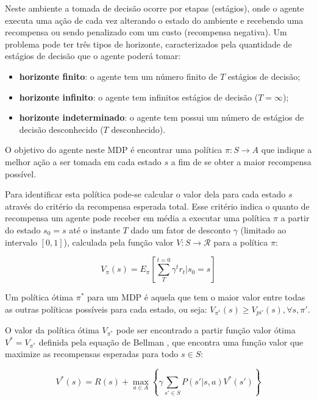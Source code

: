 \documentclass[letterpaper]{article}
\begin{document}
Neste ambiente a tomada de decisão ocorre por etapas (estágios), onde o agente executa uma ação de cada vez alterando o estado do ambiente e recebendo uma recompensa ou sendo penalizado com um custo (recompensa negativa). Um problema pode ter três tipos de horizonte, caracterizados pela quantidade de estágios de decisão que o agente poderá tomar:

\begin{itemize}
    \item \textbf{horizonte finito}: o agente tem um número finito de $T$ estágios de decisão;
    \item \textbf{horizonte infinito}: o agente tem infinitos estágios de decisão ($T = \infty$);
    \item \textbf{horizonte indeterminado}: o agente tem possui um número de estágios de decisão desconhecido ($T$ desconhecido).
\end{itemize}

O objetivo do agente neste MDP é encontrar uma política $\pi : S \rightarrow A$ que indique a melhor ação a ser tomada em cada estado $s$ a fim de se obter a maior recompensa possível.

Para identificar esta política pode-se calcular o valor dela para cada estado $s$ através do critério da recompensa esperada total. Esse critério indica o quanto de recompensa um agente pode receber em média a executar uma política $\pi$ a partir do estado $s_0 = s$ até o instante $T$ dado um fator de desconto $\gamma$ (limitado ao intervalo $[0, 1]$), calculada pela função valor $V : S \rightarrow \mathcal{R} $ para a política $\pi$:

\begin{equation} \label{eq:total_expected_reward}
    V_\pi(s) = E_\pi \left[ \sum_{T}^{t=0} \gamma^t r_t | s_0 = s \right]
\end{equation}

Um política ótima $\pi^*$ para um MDP é aquela que tem o maior valor entre todas as outras políticas possíveis para cada estado, ou seja: $V_{\pi^*}(s) \geq V_{pi'}(s), \forall s,\pi'$.

O valor da política ótima $V_{\pi^*}$ pode ser encontrado a partir função valor ótima $V^* = V_{\pi^*}$ definida pela equação de Bellman \cite{Bellman-1966}, que encontra uma função valor que maximize as recompensas esperadas para todo $s \in S$:

\begin{equation} \label{eq:bellman_equation}
    V^*(s) = R(s) + \max_{a \in A} \left\{ \gamma \sum_{s'\in S} P(s'|s,a)V^*(s') \right\}
\end{equation}
\end{document}
